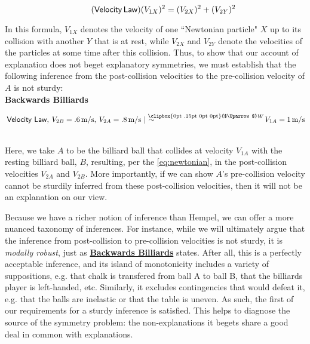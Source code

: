 \documentclass[natbib]{svjour3}                     %
\makeatletter
\newcommand{\Uuparrow}{%
	\raisebox{.2ex}{\clipbox{0pt .15pt 0pt 0pt}{$\Uparrow$}}
}
\newcommand{\nms}{%
	\mathbin{\mathpalette\@nms\expandafter}
}
\newcommand{\@nms}{\mid\joinrel\mkern-.5mu\sim}
\newcommand{\mrc}[1]{\mathbin{
		\mathchoice
		{\normalsize\hspace{.5mm}\nms^{\mkern-19mu\scriptsize\Uuparrow#1}\hspace{-.5mm}}
		{\normalsize\hspace{.5mm}\nms^{\mkern-19mu\scriptsize\Uuparrow#1}\hspace{-.5mm}}
		{\footnotesize\hspace{.5mm}\nms^{\mkern-13.5mu\fontsize{5.5}{0}\Uuparrow#1}}
		{\scriptsize\nms^{\mkern-10mu\tiny\Uuparrow#1}}
	}
}
\makeatother
\begin{document}
\begin{equation} 
	\label{eq:newtonian}
	\tag{$ \mathsf{Velocity\,Law} $}
	(V_{1X})^{2} = (V_{2X})^{2} + (V_{2Y})^{2}
\end{equation} 

In this formula, $V_{1X}$ denotes the velocity of one ``Newtonian particle" $X$ up to its collision with another $Y$ that is at rest, while $V_{2X}$ and $V_{2Y}$ denote the velocities of the particles at some time after this collision. Thus, to show that our account of explanation does not beget explanatory symmetries, we must establish that the following inference from the post-collision velocities to the pre-collision velocity of $A$ is not sturdy:\\

\noindent \label{eq:MRC_ballsbackwards}\textbf{Backwards Billiards}\hspace{8mm}\begin{minipage}[t]{.8\textwidth}
	$\hspace{.5ex} \mathsf{Velocity\ Law},\hspace{.5ex} V_{2B} = .6\,\text{m/s},\hspace{.5ex} V_{2A} = .8\,\text{m/s} \mrc{W} V_{1A} = 1\,\text{m/s}$
\end{minipage}\\ 

\noindent Here, we take $A$ to be the billiard ball that collides at velocity $V_{1A}$ with the resting billiard ball, $B$, resulting, per the \ref{eq:newtonian}, in the post-collision velocities $V_{2A}$ and $V_{2B}$. More importantly, if we can show $A$'s pre-collision velocity cannot be sturdily inferred from these post-collision velocities, then it will not be an explanation on our view.

Because we have a richer notion of inference than Hempel, we can offer a more nuanced taxonomy of inferences. For instance, while we will ultimately argue that the inference from post-collision to pre-collision velocities is not sturdy, it is \textit{modally robust}, just as \hyperref[eq:MRC_ballsbackwards]{\textbf{Backwards Billiards}} states. After all, this is a perfectly acceptable inference, and its island of monotonicity includes a variety of suppositions, e.g. that chalk is transfered from ball A to ball B, that the billiards player is left-handed, etc. Similarly, it excludes contingencies that would defeat it, e.g. that the balls are inelastic or that the table is uneven. As such, the first of our requirements for a sturdy inference is satisfied. This helps to diagnose the source of the symmetry problem: the non-explanations it begets share a good deal in common with explanations.
\end{document}
